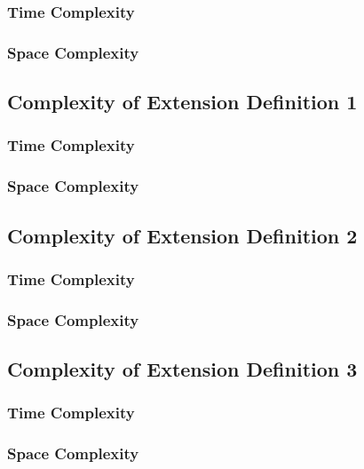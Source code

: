 \documentclass[conference]{IEEEtran}
\begin{document}
\subsubsection{Time Complexity}

\subsubsection{Space Complexity}

\subsection{Complexity of Extension Definition 1}

\subsubsection{Time Complexity}

\subsubsection{Space Complexity}

\subsection{Complexity of Extension Definition 2}

\subsubsection{Time Complexity}

\subsubsection{Space Complexity}

\subsection{Complexity of Extension Definition 3}

\subsubsection{Time Complexity}

\subsubsection{Space Complexity}
\end{document}
